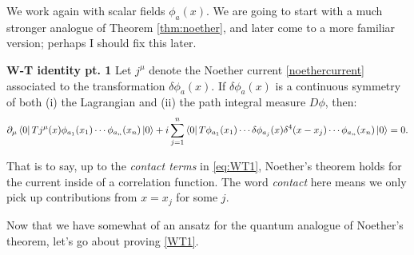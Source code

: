\documentclass[main.tex]{subfiles}
\begin{document}
We work again with scalar fields $\phi_a (x)$. We are going to start with a much stronger analogue of Theorem \ref{thm:noether}, and later come to a more familiar version; perhaps I should fix this later.

\begin{thm} \label{thm:WT1}\textbf{W-T identity pt. 1}
Let $j^\mu$ denote the Noether current \ref{noethercurrent} associated to the transformation $\delta \phi_a (x)$. If $\delta \phi_a (x)$ is a continuous symmetry of both (i) the Lagrangian and (ii) the path integral measure $D\phi$, then:
\begin{equation} \label{eq:WT1}
\partial_\mu \bra{0} T j^\mu (x) \phi_{a_1} (x_1) \cdots \phi_{a_n} (x_n) \ket{0} + i \sum_{j=1}^n \bra{0} T \phi_{a_1} (x_1) \cdots \delta \phi_{a_j} (x) \delta^4 (x-x_j) \cdots \phi_{a_n} (x_n) \ket{0} = 0.
\end{equation}
\end{thm}
That is to say, up to the \textit{contact terms} in \ref{eq:WT1}, Noether's theorem holds for the current inside of a correlation function. The word \textit{contact} here means we only pick up contributions from $x = x_j$ for some $j$.

Now that we have somewhat of an ansatz for the quantum analogue of Noether's theorem, let's go about proving \ref{WT1}.
\end{document}
